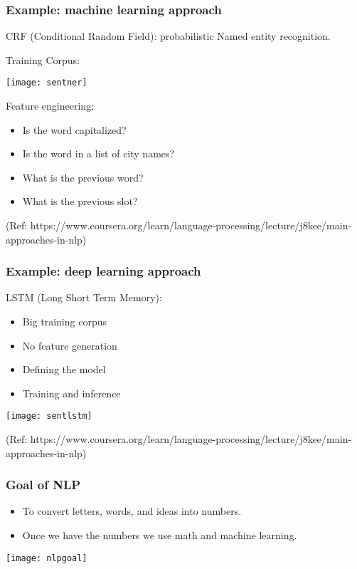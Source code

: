 \begin{frame}[fragile]\frametitle{Example: machine learning approach}

CRF (Conditional Random Field): probabilistic Named entity recognition.

Training Corpus:

\begin{center}
\texttt{[image: sentner]}
\end{center}

Feature engineering:
  \begin{itemize}
    \item  Is the word capitalized?
    \item Is the word in a list of city names?
    \item What is the previous word?
    \item What is the previous slot?
  \end{itemize}

{\tiny (Ref: https://www.coursera.org/learn/language-processing/lecture/j8kee/main-approaches-in-nlp)}
\end{frame}

\begin{frame}[fragile]\frametitle{Example: deep learning approach}

LSTM (Long Short Term Memory):
  \begin{itemize}
    \item  Big training corpus
    \item No feature generation
    \item Defining the model
    \item Training and inference
  \end{itemize}


\begin{center}
\texttt{[image: sentlstm]}
\end{center}

{\tiny (Ref: https://www.coursera.org/learn/language-processing/lecture/j8kee/main-approaches-in-nlp)}
\end{frame}



\begin{frame}[fragile]\frametitle{Goal of NLP}
  \begin{itemize}
    \item  To convert letters, words, and ideas into numbers.
    \item Once we have the numbers we use math and machine learning.
  \end{itemize}
\begin{center}
\texttt{[image: nlpgoal]}
\end{center}
\end{frame}


